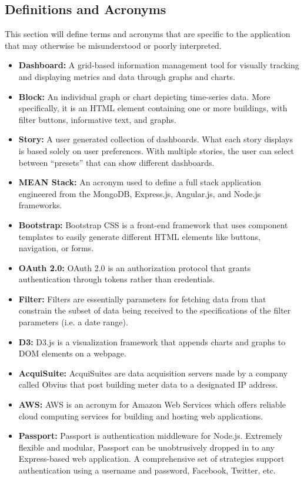 \documentclass[journal,10pt,onecolumn,compsoc]{IEEEtran}
\begin{document}
    \subsection{Definitions and Acronyms}
    This section will define terms and acronyms that are specific to the application that may otherwise be misunderstood or poorly interpreted.
    \begin{itemize}
        \item \textbf{Dashboard:}
            A grid-based information management tool for visually tracking and displaying metrics and data through graphs and charts.
        \item \textbf{Block:} 
            An individual graph or chart depicting time-series data. More specifically, it is an HTML element containing one or more buildings, with filter buttons, informative text, and graphs.
        \item \textbf{Story:} 
            A user generated collection of dashboards. What each story displays is based solely on user preferences. With multiple stories, the user can select between ``presets'' that can show different dashboards.
        \item \textbf{MEAN Stack:} 
            An acronym used to define a full stack application engineered from the MongoDB, Express.js, Angular.js, and Node.js frameworks. 
        \item \textbf{Bootstrap:} 
            Bootstrap CSS is a front-end framework that uses component templates to easily generate different HTML elements like buttons, navigation, or forms. 
        \item \textbf{OAuth 2.0:} 
            OAuth 2.0 is an authorization protocol that grants authentication through tokens rather than credentials. 
        \item \textbf{Filter:} 
            Filters are essentially parameters for fetching data from that constrain the subset of data being received to the specifications of the filter parameters (i.e. a date range). 
        \item \textbf{D3:} 
            D3.js is a visualization framework that appends charts and graphs to DOM elements on a webpage. 
        \item \textbf{AcquiSuite:} 
            AcquiSuites are data acquisition servers made by a company called Obvius that post building meter data to a designated IP address.
        \item \textbf{AWS:} 
            AWS is an acronym for Amazon Web Services which offers reliable cloud computing services for building and hosting web applications.
	   \item \textbf{Passport:} 
			Passport is authentication middleware for Node.js. Extremely flexible and modular, Passport can be unobtrusively dropped in to any Express-based web application. A comprehensive set of strategies support authentication using a username and password, Facebook, Twitter, etc.
   \end{itemize}
\end{document}
